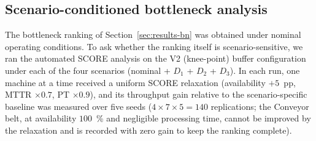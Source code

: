 \documentclass[a4paper,fleqn]{cas-sc}
\begin{document}
  \subsection{Scenario-conditioned bottleneck analysis}\label{sec:res-r2}                                                                   
  
  The bottleneck ranking of Section~\ref{sec:results-bn} was obtained                                                                       
  under nominal operating conditions. To ask whether the ranking itself
  is scenario-sensitive, we ran the automated SCORE analysis on the V2                                                                      
  (knee-point) buffer configuration under each of the four scenarios                                                                        
  (nominal + $D_1$ + $D_2$ + $D_3$). In each run, one machine at a time                                                                     
  received a uniform SCORE relaxation (availability $+5$~pp, MTTR                                                                           
  $\times 0.7$, PT $\times 0.9$), and its throughput gain relative to the                                                                   
  scenario-specific baseline was measured over five seeds                                                                                   
  ($4 \times 7 \times 5 = 140$ replications; the Conveyor belt, at                                                                          
  availability $100$~\% and negligible processing time, cannot be improved                                                                  
  by the relaxation and is recorded with zero gain to keep the ranking                                                                      
  complete).                                                                                                                                
                                                                                                                                            
\end{document}
